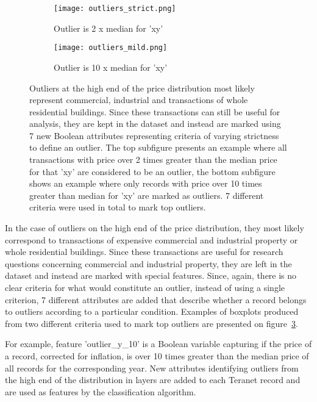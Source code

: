 \begin{figure}[ht]
    \centering
    \begin{subfigure}{\linewidth}
        \centering
        \texttt{[image: outliers\_strict.png]}
        \label{fig:top_outliers_mild}
        \caption{Outlier is 2 x median for 'xy'}
    \end{subfigure}

    \begin{subfigure}{\linewidth}
        \centering
        \texttt{[image: outliers\_mild.png]}
        \label{fig:top_outliers_strict}
        \caption{Outlier is 10 x median for 'xy'}
    \end{subfigure}
    \caption{Outliers at the high end of the price distribution most likely represent commercial, industrial and transactions of whole residential buildings.
    Since these transactions can still be useful for analysis, they are kept in the dataset and instead are marked using 7 new Boolean attributes representing criteria of varying strictness to define an outlier.
    The top subfigure presents an example where all transactions with price over 2 times greater than the median price for that 'xy' are considered to be an outlier, the bottom subfigure shows an example where only records with price over 10 times greater than median for 'xy' are marked as outliers.
    7 different criteria were used in total to mark top outliers.}
    \label{fig:top_outliers}
\end{figure}

In the case of outliers on the high end of the price distribution, they most likely correspond to transactions of expensive commercial and industrial property or whole residential buildings.
Since these transactions are useful for research questions concerning commercial and industrial property, they are left in the dataset and instead are marked with special features.
Since, again, there is no clear criteria for what would constitute an outlier, instead of using a single criterion, 7 different attributes are added that describe whether a record belongs to outliers according to a particular condition.
Examples of boxplots produced from two different criteria used to mark top outliers are presented on figure~\ref{fig:top_outliers}.

For example, feature 'outlier\_y\_10' is a Boolean variable capturing if the price of a record, corrected for inflation, is over 10 times greater than the median price of all records for the corresponding year.
New attributes identifying outliers from the high end of the distribution in layers are added to each Teranet record and are used as features by the classification algorithm.

